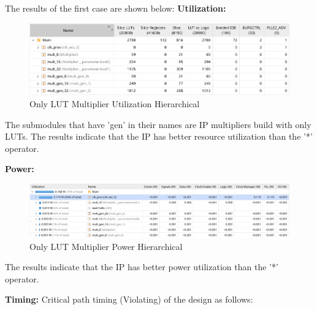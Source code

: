 \documentclass{report}
\begin{document}
The results of the first case are shown below:    
\textbf{Utilization:}
\begin{figure}[ht]
    \includegraphics[width=1\linewidth]{images/LUT_MUL_Util.png}
    \centering
    \caption{Only LUT Multiplier Utilization Hierarchical}
    \label{fig:only_lut_util}
\end{figure}

The submodules that have 'gen' in their names are IP multipliers build with only LUTs. The results indicate that the IP has better resource utilization than the '*' operator.

\textbf{Power:}
\begin{figure}[ht]
    \includegraphics[width=1\linewidth]{images/LUT_MUL_POWER.png}
    \centering
    \caption{Only LUT Multiplier Power Hierarchical}
    \label{fig:only_lut_power}
\end{figure}

The results indicate that the IP has better power utilization than the '*' operator.

\textbf{Timing:}
Critical path timing (Violating) of the design as follows:
\end{document}
